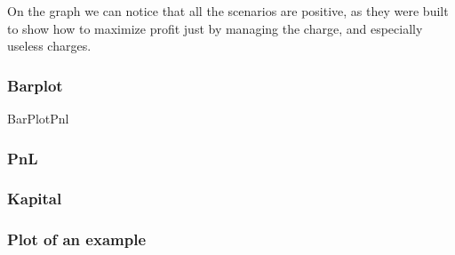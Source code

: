 \documentclass[8pt]{article} %
\begin{document}
On the graph we can notice that all the scenarios are positive, as they were built to show how to maximize profit
just by managing the charge, and especially useless charges.\\



\subsubsection{Barplot}


{\footnotesize
BarPlotPnl
}
\subsubsection{PnL}
%

\subsubsection{Kapital}
%

\subsubsection{Plot of an example}


%

%
\end{document}
